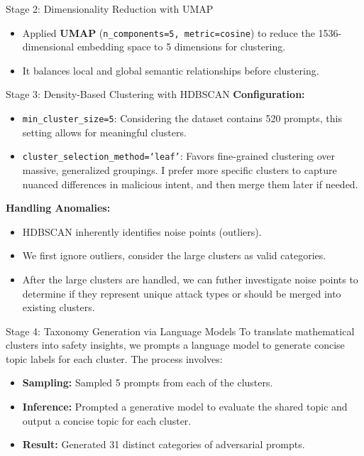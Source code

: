 \documentclass[aspectratio=169]{beamer}
\begin{document}
\begin{frame}{Stage 2: Dimensionality Reduction with UMAP}
    \begin{itemize}
        \item Applied \textbf{UMAP} (\texttt{n\_components=5, metric=cosine}) to reduce the 1536-dimensional embedding space to 5 dimensions for clustering.
        \item It balances local and global semantic relationships before clustering.
    \end{itemize}
\end{frame}

\begin{frame}{Stage 3: Density-Based Clustering with HDBSCAN}
    \textbf{Configuration:}
    \begin{itemize}
        \item \texttt{min\_cluster\_size=5}: Considering the dataset contains 520 prompts, this setting allows for meaningful clusters.
        \item \texttt{cluster\_selection\_method=`leaf'}: Favors fine-grained clustering over massive, generalized groupings. I prefer more specific clusters to capture nuanced differences in malicious intent, and then merge them later if needed.
    \end{itemize}
    \vspace{0.3cm}
    
    \textbf{Handling Anomalies:}
    \begin{itemize}
        \item HDBSCAN inherently identifies noise points (outliers). 
        \item We first ignore outliers, consider the large clusters as valid categories.
        \item After the large clusters are handled, we can futher investigate noise points to determine if they represent unique attack types or should be merged into existing clusters.
    \end{itemize}
\end{frame}

\begin{frame}{Stage 4: Taxonomy Generation via Language Models}
    To translate mathematical clusters into safety insights, we prompts a language model to generate concise topic labels for each cluster. The process involves:
    \vspace{0.3cm}
    
    \begin{itemize}
        \item \textbf{Sampling:} Sampled 5 prompts from each of the clusters.
        \item \textbf{Inference:} Prompted a generative model to evaluate the shared topic and output a concise topic for each cluster.
        \item \textbf{Result:} Generated 31 distinct categories of adversarial prompts.
    \end{itemize}
\end{frame}
\end{document}
